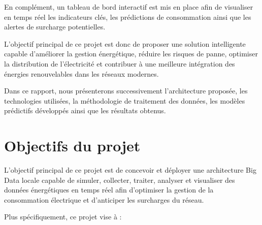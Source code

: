 \documentclass[12pt,a4paper]{report}
\begin{document}
En complément, un tableau de bord interactif est mis en place afin de visualiser en temps réel les indicateurs clés, les prédictions de consommation ainsi que les alertes de surcharge potentielles.

L’objectif principal de ce projet est donc de proposer une solution intelligente capable d’améliorer la gestion énergétique, réduire les risques de panne, optimiser la distribution de l’électricité et contribuer à une meilleure intégration des énergies renouvelables dans les réseaux modernes.

Dans ce rapport, nous présenterons successivement l’architecture proposée, les technologies utilisées, la méthodologie de traitement des données, les modèles prédictifs développés ainsi que les résultats obtenus.

\chapter{Objectifs du projet}

L’objectif principal de ce projet est de concevoir et déployer une architecture Big Data locale capable de simuler, collecter, traiter, analyser et visualiser des données énergétiques en temps réel afin d’optimiser la gestion de la consommation électrique et d’anticiper les surcharges du réseau.

Plus spécifiquement, ce projet vise à :
\end{document}

